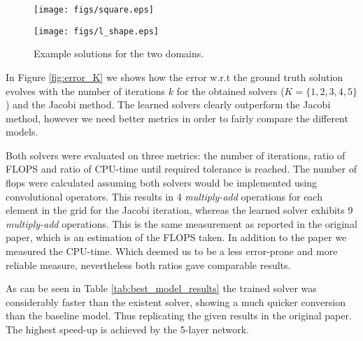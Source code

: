 \documentclass{article} %
\begin{document}
\begin{figure}[]
    \centering
    \begin{minipage}{.5\textwidth}
        \centering
        \texttt{[image: figs/square.eps]}
    \end{minipage}%
    \begin{minipage}{0.5\textwidth}
        \centering
        \texttt{[image: figs/l\_shape.eps]}
    \end{minipage}
    \caption{Example solutions for the two domains.}
    \label{fig:example_solutions}
\end{figure}

In Figure \ref{fig:error_K} we shows how the error w.r.t the ground truth solution evolves with the number of iterations $k$ for the obtained solvers ($K=\{1,2,3,4,5\}$) and the Jacobi method. The learned solvers clearly outperform the Jacobi method, however we need better metrics in order to fairly compare the different models.

Both solvers were evaluated on three metrics: the number of iterations, ratio of FLOPS and ratio of CPU-time until required tolerance is reached. The number of flops were calculated assuming both solvers would be implemented using convolutional operators. This results in 4 \textit{multiply-add} operations for each element in the grid for the Jacobi iteration, whereas the learned solver exhibits 9 \textit{multiply-add} operations. This is the same measurement as reported in the original paper, which is an estimation of the FLOPS taken. In addition to the paper we measured the CPU-time. Which deemed us to be a less error-prone and more reliable measure, nevertheless both ratios gave comparable results.

As can be seen in Table \ref{tab:best_model_results} the trained solver was considerably faster than the existent solver, showing a much quicker conversion than the baseline model. Thus replicating the given results in the original paper. The highest speed-up is achieved by the 5-layer network.

\end{document}
